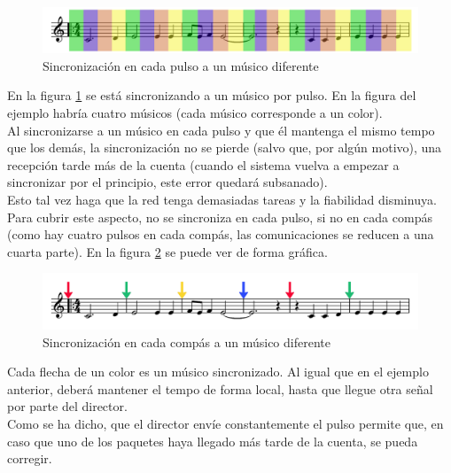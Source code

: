 \begin{figure}[!htb]
\centering
\includegraphics[width=1\textwidth]{./imagenes/sincronotas}
\caption{Sincronización en cada pulso a un músico diferente} \label{fig:sincronotas}
\end{figure}

En la figura \ref{fig:sincronotas} se está sincronizando a un músico por pulso. En
la figura del ejemplo habría cuatro músicos (cada músico corresponde a un color).\\

Al sincronizarse a un músico en cada pulso y que él mantenga el mismo tempo que los demás,
la sincronización no se pierde (salvo que, por algún motivo), una recepción tarde más de
la cuenta (cuando el sistema vuelva a empezar a sincronizar por el principio, este error quedará
subsanado).\\

Esto tal vez haga que la red tenga demasiadas tareas y la fiabilidad disminuya. Para
cubrir este aspecto, no se sincroniza en cada pulso, si no en cada compás (como hay
cuatro pulsos en cada compás, las comunicaciones se reducen a una cuarta parte).
En la figura \ref{fig:sincrocompas} se puede ver de forma gráfica.\\

\begin{figure}[!htb]
\centering
\includegraphics[width=1\textwidth]{./imagenes/sincrocompas}
\caption{Sincronización en cada compás a un músico diferente} \label{fig:sincrocompas}
\end{figure}

Cada flecha de un color es un músico sincronizado. Al igual que en el ejemplo anterior,
deberá mantener el tempo de forma local, hasta que llegue otra señal por parte del director.\\

Como se ha dicho, que el director envíe constantemente el pulso permite que, en caso que uno de los
paquetes haya llegado más tarde de la cuenta, se pueda corregir.\\

